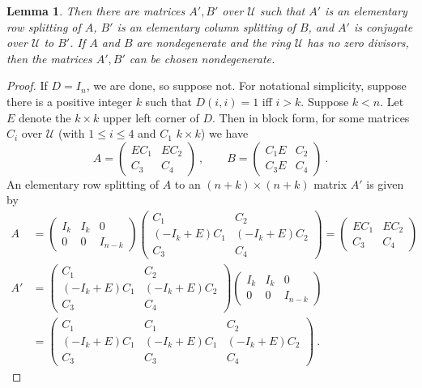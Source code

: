 \documentclass{amsart}
\newtheorem{lemma}[theorem]{Lemma}
\theoremstyle{definition}
\theoremstyle{remark}
\numberwithin{equation}{section}
\begin{document}
{\begin{lemma}
Then there are matrices $A',B'$ over $\mathcal U$ such that 
$A'$ is an elementary row splitting of $A$, 
$B'$ is an elementary column splitting of $B$, 
and $A'$ is conjugate over $\mathcal U$ to $B'$. 
If $A$ and $B$ are nondegenerate and the ring $\mathcal U$ 
has no zero divisors, then the matrices $A',B'$ 
can be chosen nondegenerate. 
\end{lemma} 

\begin{proof} 
If $D=I_n$, we are done, so suppose not. For notational simplicity, suppose there is 
a positive integer $k$ such that $D(i,i) =1$ iff $i>k$. Suppose 
$k<n$.  Let $E$ denote the 
$k\times k$ upper left corner of $D$. Then in block form, for 
some matrices $C_i$ over $\mathcal U$ (with $1\leq i\leq 4$ and $C_1$ $k\times k$) 
we have 
\[
A = \begin{pmatrix} EC_1 & EC_2\\C_3&C_4 \end{pmatrix} \ , \qquad 
B = \begin{pmatrix} C_1E & C_2\\C_3E&C_4 \end{pmatrix} \ . 
\] 
An elementary row splitting of $A$ to an $(n+k)\times (n+k)$ matrix $A'$ 
is given by 
\begin{align*}
A & 
 = \begin{pmatrix} I_k & I_k& 0 \\0 & 0 & I_{n-k} \end{pmatrix} 
 \begin{pmatrix} C_1 & C_2\\(-I_k+E)C_1&(-I_k+E)C_2\\C_3 & C_4 \end{pmatrix}
=\begin{pmatrix} EC_1 & EC_2\\C_3&C_4 \end{pmatrix}  \\ 
A'
&= \begin{pmatrix} C_1 & C_2\\(-I_k+E)C_1&(-I_k+E)C_2\\C_3 & C_4 \end{pmatrix}
 \begin{pmatrix} I_k & I_k& 0 \\0 & 0 & I_{n-k} \end{pmatrix}  \\ 
&=\begin{pmatrix} C_1 & C_1 & 
C_2\\(-I_k+E)C_1&(-I_k+E)C_1&(-I_k+E)C_2\\C_3 &C_3 & C_4 \end{pmatrix} \ .

\end{align*}
\end{proof}}
\end{document}
